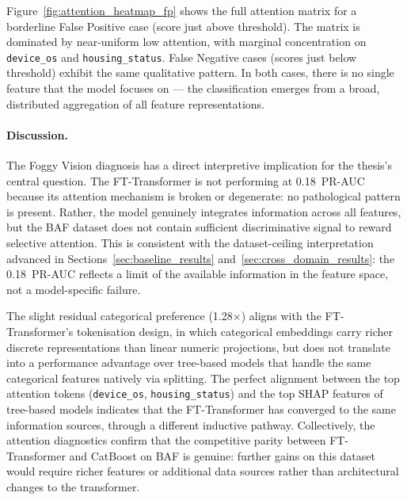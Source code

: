 Figure~\ref{fig:attention_heatmap_fp} shows the full attention matrix for a borderline False Positive case (score just above threshold). The matrix is dominated by near-uniform low attention, with marginal concentration on \texttt{device\_os} and \texttt{housing\_status}. False Negative cases (scores just below threshold) exhibit the same qualitative pattern. In both cases, there is no single feature that the model focuses on — the classification emerges from a broad, distributed aggregation of all feature representations.

\paragraph{Discussion.}
The Foggy Vision diagnosis has a direct interpretive implication for the thesis's central question. The FT-Transformer is not performing at 0.18~PR-AUC because its attention mechanism is broken or degenerate: no pathological pattern is present. Rather, the model genuinely integrates information across all features, but the BAF dataset does not contain sufficient discriminative signal to reward selective attention. This is consistent with the dataset-ceiling interpretation advanced in Sections~\ref{sec:baseline_results} and~\ref{sec:cross_domain_results}: the 0.18~PR-AUC reflects a limit of the available information in the feature space, not a model-specific failure.

The slight residual categorical preference (1.28$\times$) aligns with the FT-Transformer's tokenisation design, in which categorical embeddings carry richer discrete representations than linear numeric projections, but does not translate into a performance advantage over tree-based models that handle the same categorical features natively via splitting. The perfect alignment between the top attention tokens (\texttt{device\_os}, \texttt{housing\_status}) and the top SHAP features of tree-based models indicates that the FT-Transformer has converged to the same information sources, through a different inductive pathway. Collectively, the attention diagnostics confirm that the competitive parity between FT-Transformer and CatBoost on BAF is genuine: further gains on this dataset would require richer features or additional data sources rather than architectural changes to the transformer.

\clearpage

